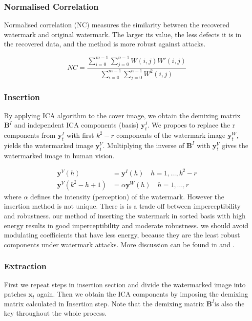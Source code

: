 \subsubsection{Normalised Correlation}
Normalised correlation (NC) measures the similarity between the recovered watermark and original watermark. The larger its value, the less defects it is in the recovered data, and the method is more robust against attacks.

\begin{equation}
    NC =  \frac{\sum_{i=0}^{m-1} \sum_{j=0}^{n-1}W(i,j) W'(i,j)} {\sum_{i=0}^{m-1} \sum_{j=0}^{n-1} W^2(i,j)}
\end{equation}

\subsubsection{Insertion}
By applying ICA algorithm to the cover image, we obtain the demixing matrix $\mathbf{B}^I$ and independent ICA components (basis) $\mathbf{y}^I_t$. 
We propoes to replace the r components from $\mathbf{y}^I_t$ with first $k^2 -r$ components of the watermark image $\mathbf{y}^W_t$, yields the watermarked image  $\mathbf{y}^V_t$. Multiplying the inverse of $\mathbf{B}^I$ with $\mathbf{y}^V_t$ gives the watermarked image in human vision. 

\begin{align}
    \mathbf{y}^V(h) &=  \mathbf{y}^I(h) \quad h = 1,...,k^2-r \\
    \mathbf{y}^V(k^2-h+1) &= \alpha  \mathbf{y}^W(h) \quad h = 1,...,r
\end{align}
where $\alpha$ defines the intensity (perception) of the watermark. However the insertion method is not unique. 
There is is a trade off between imperceptibility and robustness. 
our method of inserting the watermark in sorted basis with high energy results in good imperceptibility and moderate robustness.
we should avoid modulating coefficients that have less energy, because they are the least robust components under watermark attacks. More discussion can be found in \cite{LuWei_ICA} and \cite{Yu2017}.

\subsubsection{Extraction}
First we repeat steps in insertion section and divide the watermarked image into patches $\mathbf{x}_t$ again. Then we obtain the ICA components by imposing the demixing matrix calculated in Insertion step. Note that the demixing matrix $\mathbf{B}^I$is also the key throughout the whole process.

